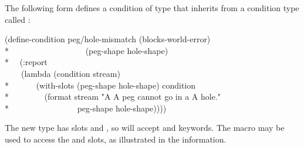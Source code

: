 \begin{defmac}
  The following form defines a condition of type  that
  inherits from a condition type called :
\begin{lisp}
(define-condition peg/hole-mismatch (blocks-world-error) \\*
~~~~~~~~~~~~~~~~~~(peg-shape hole-shape) \\*
~~(:report \\
~~~~(lambda (condition stream) \\*
~~~~~~(with-slots (peg-shape hole-shape) condition \\*
~~~~~~~~(format stream "A {\Xtilde}A peg cannot go in a {\Xtilde}A hole." \\*
~~~~~~~~~~~~~~~~peg-shape hole-shape))))
\end{lisp}
  The new type has slots  and , so  will
  accept  and  keywords. The  macro 
  may be used to access the  and  slots,
  as illustrated in the  information.


\end{defmac}

